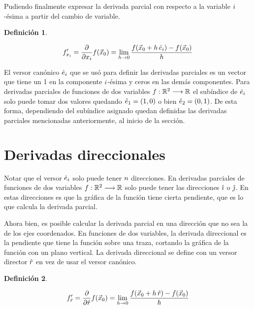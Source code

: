 \documentclass[a5paper,12pt,twoside]{book}
\newtheorem{defn}{{Definición}}[chapter]
\begin{document}
Pudiendo finalmente expresar la derivada parcial con respecto a la variable $i$-ésima a partir del cambio de variable.

\begin{mdframed}[style=DefinitionFrame]
    \begin{defn}
    \end{defn}
    \begin{equation*}
    f_{x_i}'
    = \frac{\partial}{\partial x_i} f(\Vec{x}_0)
    = \lim_{h \to 0} \frac{f(\Vec{x}_0 + h\,\hat{e}_i) - f(\Vec{x}_0)}{h}
\end{equation*}
\end{mdframed}

El versor canónico $\hat{e}_i$ que se usó para definir las derivadas parciales es un vector que tiene un 1 en la componente $i$-ésima y ceros en las demás componentes.
Para derivadas parciales de funciones de dos variables $f:\mathbb{R}^2 \longrightarrow \mathbb{R}$ el subíndice de $\hat{e}_i$ solo puede tomar dos valores quedando $\hat{e}_1=(1,0)$ o bien $\hat{e}_2=(0,1)$.
De esta forma, dependiendo del subíndice asignado quedan definidas las derivadas parciales mencionadas anteriormente, al inicio de la sección.

    
\section{Derivadas direccionales}

Notar que el versor $\hat{e}_i$ solo puede tener $n$ direcciones.
En derivadas parciales de funciones de dos variables $f:\mathbb{R}^2 \longrightarrow \mathbb{R}$ solo puede tener las direcciones $\hat{\imath}$ o $\hat{\jmath}$.
En estas direcciones es que la gráfica de la función tiene cierta pendiente, que es lo que calcula la derivada parcial.

Ahora bien, es posible calcular la derivada parcial en una dirección que no sea la de los ejes coordenados.
En funciones de dos variables, la derivada direccional es la pendiente que tiene la función sobre una traza, cortando la gráfica de la función con un plano vertical.
La derivada direccional se define con un versor director $\hat{r}$ en vez de usar el versor canónico.

\begin{mdframed}[style=DefinitionFrame]
    \begin{defn}
    \end{defn}
    \begin{equation*}
        f_{\hat{r}}'
        = \frac{\partial}{\partial \hat{r}} f(\Vec{x}_0)
        = \lim_{h \to 0} \frac{f(\Vec{x}_0+h\,\hat{r})-f(\Vec{x}_0)}{h}
    \end{equation*}
\end{mdframed}
\end{document}
